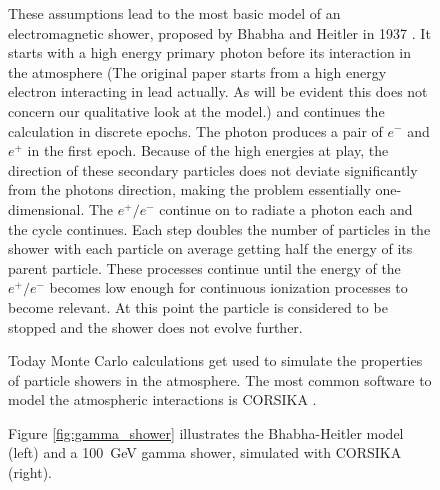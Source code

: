 \begin{figure}
These assumptions lead to the most basic model of an 
electromagnetic shower, proposed by Bhabha and Heitler in 1937
\cite{doi:10.1098/rspa.1937.0082}.
It starts with a high energy primary photon before its interaction in the atmosphere 
(The original paper starts from a high energy electron interacting in lead actually.
As will be evident this does not concern our qualitative look at the model.) and continues 
the calculation in discrete epochs.
The photon produces a pair of $e^-$ and $e^+$ in the first epoch.
Because of the high energies at play, the direction of these secondary 
particles does not deviate significantly from the photons direction, 
making the problem essentially one-dimensional.
The $e^+/e^-$ continue on to radiate a photon each and the cycle continues.
Each step doubles the number of particles in the shower with each particle 
on average getting half the energy of its parent particle.
These processes continue until the energy of the $e^+/e^-$ becomes low enough for
continuous ionization processes to become relevant.
At this point the particle is considered to be stopped and the shower
does not evolve further.

Today Monte Carlo calculations get used to simulate the properties 
of particle showers in the atmosphere.
The most common software to model the atmospheric interactions is
CORSIKA \cite{Engel:2018akg}.

Figure \ref{fig:gamma_shower} illustrates the Bhabha-Heitler model (left)
and a \SI{100}{\giga\electronvolt} gamma shower, simulated with CORSIKA (right).


\end{figure}
